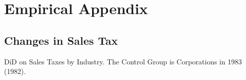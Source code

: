\documentclass[
  12pt]{article}
\theoremstyle{definition}
\theoremstyle{remark}
\begin{document}
\begin{table}
\begin{minipage}{\linewidth}
\end{minipage}%

\end{table}%

\section{Empirical Appendix}\label{empirical-appendix}

\subsection{Changes in Sales Tax}\label{changes-in-sales-tax}

\begin{table}

\caption{\label{tbl-reg-did-inds}DiD on Sales Taxes by Industry. The
Control Group is Corporations in 1983 (1982).}

\begin{minipage}{\linewidth}


\end{minipage}
\end{table}
\end{document}
